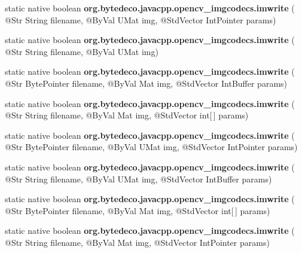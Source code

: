 \begin{DoxyCompactItemize}
static native boolean {\bfseries org.\+bytedeco.\+javacpp.\+opencv\+\_\+imgcodecs.\+imwrite} ( @Str String filename, @By\+Val U\+Mat img, @Std\+Vector Int\+Pointer params)
\item 
\mbox{\label{group__imgcodecs_ga44f811384094e540d47dd361b9fce35c}} 
static native boolean {\bfseries org.\+bytedeco.\+javacpp.\+opencv\+\_\+imgcodecs.\+imwrite} ( @Str String filename, @By\+Val U\+Mat img)
\item 
\mbox{\label{group__imgcodecs_ga7f3464d31dd010a96251a16c96e87930}} 
static native boolean {\bfseries org.\+bytedeco.\+javacpp.\+opencv\+\_\+imgcodecs.\+imwrite} ( @Str Byte\+Pointer filename, @By\+Val Mat img, @Std\+Vector Int\+Buffer params)
\item 
\mbox{\label{group__imgcodecs_gae1bb1616b747801cb7c83e3661803f96}} 
static native boolean {\bfseries org.\+bytedeco.\+javacpp.\+opencv\+\_\+imgcodecs.\+imwrite} ( @Str String filename, @By\+Val Mat img, @Std\+Vector int\mbox{[}$\,$\mbox{]} params)
\item 
\mbox{\label{group__imgcodecs_gab82728f854d9b3313757b79b10df2468}} 
static native boolean {\bfseries org.\+bytedeco.\+javacpp.\+opencv\+\_\+imgcodecs.\+imwrite} ( @Str Byte\+Pointer filename, @By\+Val U\+Mat img, @Std\+Vector Int\+Pointer params)
\item 
\mbox{\label{group__imgcodecs_gabd16cb5d3f835469dffb2399e20c6cdf}} 
static native boolean {\bfseries org.\+bytedeco.\+javacpp.\+opencv\+\_\+imgcodecs.\+imwrite} ( @Str String filename, @By\+Val U\+Mat img, @Std\+Vector Int\+Buffer params)
\item 
\mbox{\label{group__imgcodecs_ga75ecf057e27033e5d729d0b493b30ccf}} 
static native boolean {\bfseries org.\+bytedeco.\+javacpp.\+opencv\+\_\+imgcodecs.\+imwrite} ( @Str Byte\+Pointer filename, @By\+Val Mat img, @Std\+Vector int\mbox{[}$\,$\mbox{]} params)
\item 
\mbox{\label{group__imgcodecs_ga9efcfd974ac0c314c63136acf9cb26c1}} 
static native boolean {\bfseries org.\+bytedeco.\+javacpp.\+opencv\+\_\+imgcodecs.\+imwrite} ( @Str String filename, @By\+Val Mat img, @Std\+Vector Int\+Pointer params)

\end{DoxyCompactItemize}
